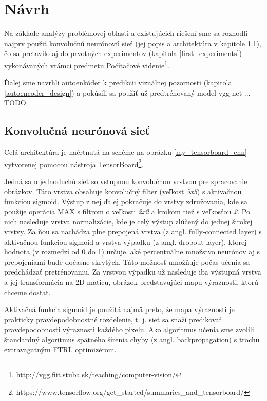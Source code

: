 
\newpage
\section{Návrh}
\label{design}


Na základe analýzy problémovej oblasti a existujúcich riešení sme sa rozhodli najprv použiť konvolučnú neurónovú sieť (jej popis a architektúra v kapitole \ref{nn_popis}), čo sa pretavilo aj do prvotných experimentov (kapitola \ref{first_experiments}) vykonávaných vrámci predmetu Počítačové videnie\footnote{http://vgg.fiit.stuba.sk/teaching/computer-vision/}.

Ďalej sme navrhli autoenkóder k predikcii vizuálnej pozornosti (kapitola \ref{autoencoder_design}) a pokúsili sa použiť už predtrénovaný model vgg net ... TODO %

\subsection{Konvolučná neurónová sieť}
\label{nn_popis}

Celá architektúra je načrtnutá na schéme na obrázku \ref{my_tensorboard_cnn} vytvorenej pomocou nástroja  TensorBoard\footnote{https://www.tensorflow.org/get\_started/summaries\_and\_tensorboard/}.

Jedná sa o jednoduchú sieť so vstupnou konvolučnou vrstvou pre spracovanie obrázkov. Táto vrstva obsahuje konvolučný filter (veľkosť \textit{5x5}) s aktivačnou funkciou sigmoid. Výstup z nej ďalej pokračuje do vrstvy združovania, kde sa použije operácia MAX s filtrom o veľkosti \textit{2x2} a krokom tiež s veľkosťou \textit{2}. Po nich nasleduje vrstva normalizácie, kde je celý výstup zlúčený do jednej širokej vrstvy. Za ňou sa nachádza plne prepojená vrstva (z angl. fully-connected layer) s aktivačnou funkciou sigmoid a vrstva výpadku (z angl. dropout layer\cite{dropout}), ktorej hodnota (v rozmedzí od 0 do 1) určuje, aké percentuálne množstvo neurónov aj s prepojeniami bude dočasne skrytých. Táto možnosť umožňuje počas učenia sa predchádzať pretrénovaniu. Za vrstvou výpadku už nasleduje iba výstupná vrstva a jej transformácia na 2D maticu, obrázok predstavujúci mapu výraznosti, ktorú chceme dostať.

Aktivačná funkcia sigmoid je použitá najmä preto, že mapa výraznosti je prakticky pravdepodobnostné rozdelenie, t. j. sieť sa snaží predikovať pravdepodobnosti výraznosti každého pixelu. Ako algoritmus učenia sme zvolili štandardný algoritmus spätného šírenia chyby (z angl. backpropagation) s trochu extravagatným FTRL optimizérom.


